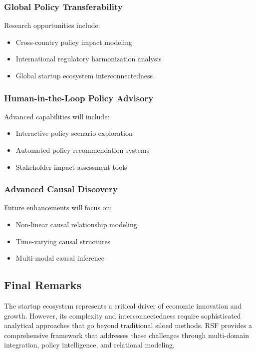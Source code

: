 \documentclass[conference]{IEEEtran}
\begin{document}
\subsubsection{Global Policy Transferability}
Research opportunities include:
\begin{itemize}
    \item Cross-country policy impact modeling
    \item International regulatory harmonization analysis
    \item Global startup ecosystem interconnectedness
\end{itemize}

\subsubsection{Human-in-the-Loop Policy Advisory}
Advanced capabilities will include:
\begin{itemize}
    \item Interactive policy scenario exploration
    \item Automated policy recommendation systems
    \item Stakeholder impact assessment tools
\end{itemize}

\subsubsection{Advanced Causal Discovery}
Future enhancements will focus on:
\begin{itemize}
    \item Non-linear causal relationship modeling
    \item Time-varying causal structures
    \item Multi-modal causal inference
\end{itemize}

\subsection{Final Remarks}

The startup ecosystem represents a critical driver of economic innovation and growth. However, its complexity and interconnectedness require sophisticated analytical approaches that go beyond traditional siloed methods. RSF provides a comprehensive framework that addresses these challenges through multi-domain integration, policy intelligence, and relational modeling.
\end{document}
